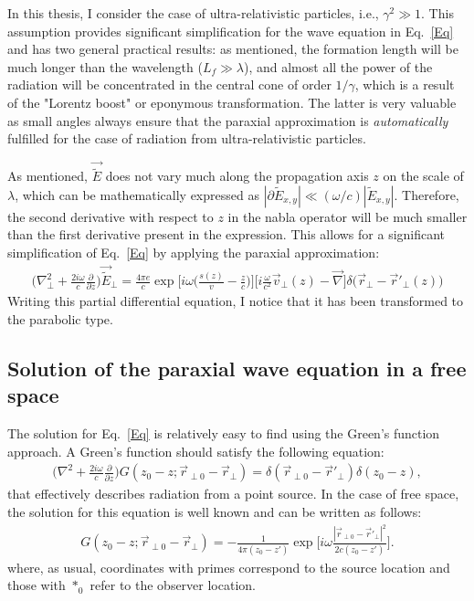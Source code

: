     In this thesis, I consider the case of ultra-relativistic particles, i.e., $\gamma^2 \gg 1$. This assumption provides significant simplification for the wave equation in Eq.~\ref{Eq} and has two general practical results: as mentioned, the formation length will be much longer than the wavelength ($L_f \gg \lambda$), and almost all the power of the radiation will be concentrated in the central cone of order $1/\gamma$, which is a result of the "Lorentz boost" or eponymous transformation. The latter is very valuable as small angles always ensure that the paraxial approximation is \textit{automatically} fulfilled for the case of radiation from ultra-relativistic particles.   

    As mentioned, $\vec{\tilde{E}}$ does not vary much along the propagation axis $z$ on the scale of $\lambda$, which can be mathematically expressed as $|\partial \tilde{E}_{x, y}| \ll (\omega/c)|\tilde{E}_{x, y}|$. Therefore, the second derivative with respect to $z$ in the nabla operator will be much smaller than the first derivative present in the expression. This allows for a significant simplification of Eq.~\ref{Eq} by applying the paraxial approximation:
    \begin{align}
        \bigg( \nabla^2_\perp + \frac{2 i \omega}{c} \frac{\partial }{\partial z} \bigg) \vec{\tilde{E}}_\perp = \frac{4 \pi e}{c} \exp{\bigg[ i\omega \bigg(\frac{s(z)}{v} - \frac{z}{c} \bigg)\bigg] \bigg[i \frac{\omega}{c^2} \vec{v}_\perp(z) - \vec{\nabla}\bigg]\delta\big(\vec{r}_{\perp} - \vec{r}'_{\perp}(z)\big)}
        \label{Eq:nonhomogeneous_paraxial_wave_eq}
    \end{align}
    Writing this partial differential equation, I notice that it has been transformed to the parabolic type.
    
\subsection{Solution of the paraxial wave equation in a free space}
    The solution for Eq.~\ref{Eq} is relatively easy to find using the Green's function approach. A Green's function should satisfy the following equation:
    \begin{align}
        \bigg( \nabla^2 + \frac{2 i \omega}{c} \frac{\partial }{\partial z} \bigg) G(z_0 - z; \vec{r}_{\perp 0} - \vec{r}_{\perp}) = \delta(\vec{r}_{\perp 0} - \vec{r}'_{\perp})\delta(z_0 - z), 
        \label{Eq:Green_func_delta}
    \end{align}
    that effectively describes radiation from a point source. In the case of free space, the solution for this equation is well known and can be written as follows:
    \begin{align}
        G(z_0 - z; \vec{r}_{\perp 0} - \vec{r}_{\perp}) = -\frac{1}{4 \pi (z_0 - z')} \exp{\bigg[ i \omega \frac{|\vec{r}_{\perp 0} - \vec{r}'_{\perp}|^2}{2c(z_0 - z')}\bigg]}.
    \end{align}
    where, as usual, coordinates with primes correspond to the source location and those with $*_0$ refer to the observer location.
    
